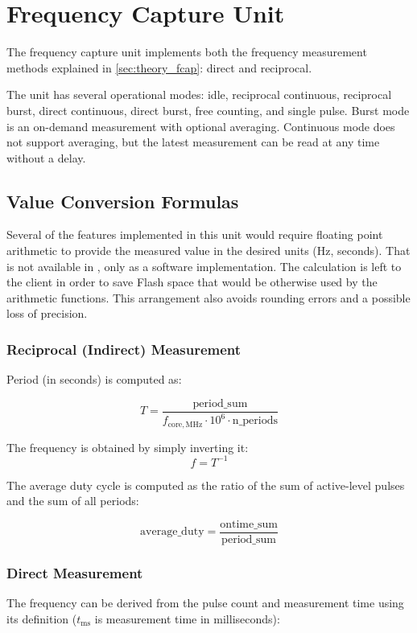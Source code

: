 
\section{Frequency Capture Unit}

The frequency capture unit implements both the frequency measurement methods explained in \cref{sec:theory_fcap}: direct and reciprocal.

The unit has several operational modes: idle, reciprocal continuous, reciprocal burst, direct continuous, direct burst, free counting, and single pulse. Burst mode is an on-demand measurement with optional averaging. Continuous mode does not support averaging, but the latest measurement can be read at any time without a delay.

\subsection{Value Conversion Formulas}

Several of the features implemented in this unit would require floating point arithmetic to provide the measured value in the desired units (Hz, seconds). That is not available in \armcm, only as a software implementation. The calculation is left to the client in order to save Flash space that would be otherwise used by the arithmetic functions. This arrangement also avoids rounding errors and a possible loss of precision.

\subsubsection{Reciprocal (Indirect) Measurement}

Period (in seconds) is computed as:

\[
	T = \dfrac{\mathrm{period\_sum}}{f_\mathrm{core,MHz} \cdot 10^6 \cdot \mathrm{n\_periods}}
\]

\noindent
The frequency is obtained by simply inverting it: \[f=T^{-1}\]

The average duty cycle is computed as the ratio of the sum of active-level pulses and the sum of all periods:

\[\mathrm{average\_duty} = \dfrac{\mathrm{ontime\_sum}}{\mathrm{period\_sum}}\]

\subsubsection{Direct Measurement}

The frequency can be derived from the pulse count and measurement time using its definition ($t_\mathrm{ms}$ is measurement time in milliseconds):

